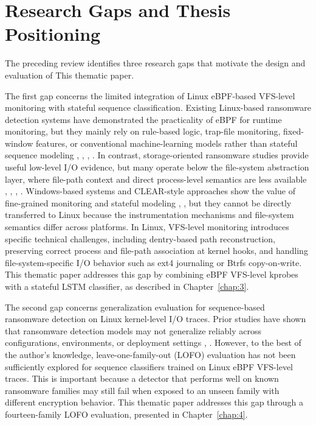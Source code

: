 \section{Research Gaps and Thesis Positioning}\label{sec:2.5}

The preceding review identifies three research gaps that motivate the design and evaluation of This thematic paper.

The first gap concerns the limited integration of Linux eBPF-based VFS-level monitoring with stateful sequence classification. Existing Linux-based ransomware detection systems have demonstrated the practicality of eBPF for runtime monitoring, but they mainly rely on rule-based logic, trap-file monitoring, fixed-window features, or conventional machine-learning models rather than stateful sequence modeling \cite{ref10}, \cite{ref11}, \cite{ref13}, \cite{ref17}. In contrast, storage-oriented ransomware studies provide useful low-level I/\allowbreak{}O evidence, but many operate below the file-system abstraction layer, where file-path context and direct process-level semantics are less available \cite{ref22}, \cite{ref23}, \cite{ref25}, \cite{ref26}. Windows-based systems and CLEAR-style approaches show the value of fine-grained monitoring and stateful modeling \cite{ref9}, \cite{ref14}, but they cannot be directly transferred to Linux because the instrumentation mechanisms and file-system semantics differ across platforms. In Linux, VFS-level monitoring introduces specific technical challenges, including dentry-based path reconstruction, preserving correct process and file-path association at kernel hooks, and handling file-system-specific I/\allowbreak{}O behavior such as ext4 journaling or Btrfs copy-on-write. This thematic paper addresses this gap by combining eBPF VFS-level kprobes with a stateful \textmu{}LSTM classifier, as described in Chapter~\ref{chap:3}.

The second gap concerns generalization evaluation for sequence-based ransomware detection on Linux kernel-level I/\allowbreak{}O traces. Prior studies have shown that ransomware detection models may not generalize reliably across configurations, environments, or deployment settings \cite{ref12}, \cite{ref15}. However, to the best of the author's knowledge, leave-one-family-out (LOFO) evaluation has not been sufficiently explored for sequence classifiers trained on Linux eBPF VFS-level traces. This is important because a detector that performs well on known ransomware families may still fail when exposed to an unseen family with different encryption behavior. This thematic paper addresses this gap through a fourteen-family LOFO evaluation, presented in Chapter~\ref{chap:4}.

